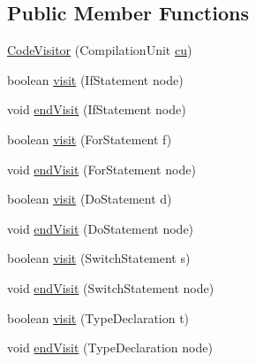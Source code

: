 \subsection*{Public Member Functions}
\begin{DoxyCompactItemize}
\item 
\hyperlink{classit_1_1isislab_1_1masonhelperdocumentation_1_1visitor_1_1_code_visitor_a187184161108b27007b877d0c2370443}{Code\-Visitor} (Compilation\-Unit \hyperlink{classit_1_1isislab_1_1masonhelperdocumentation_1_1visitor_1_1_code_visitor_af9088f73f92fd3640698ad4e660f042b}{cu})
\item 
boolean \hyperlink{classit_1_1isislab_1_1masonhelperdocumentation_1_1visitor_1_1_code_visitor_a8725175075e5b835707c806d7d168366}{visit} (If\-Statement node)
\item 
void \hyperlink{classit_1_1isislab_1_1masonhelperdocumentation_1_1visitor_1_1_code_visitor_ab5af98ceed9837f084b6d0a677b655ff}{end\-Visit} (If\-Statement node)
\item 
boolean \hyperlink{classit_1_1isislab_1_1masonhelperdocumentation_1_1visitor_1_1_code_visitor_ac93a6ee9bc2290dc054774d26a1e85f1}{visit} (For\-Statement f)
\item 
void \hyperlink{classit_1_1isislab_1_1masonhelperdocumentation_1_1visitor_1_1_code_visitor_ac0c818698da51575c8a9c9b6f643a96f}{end\-Visit} (For\-Statement node)
\item 
boolean \hyperlink{classit_1_1isislab_1_1masonhelperdocumentation_1_1visitor_1_1_code_visitor_afe7c0b57633a57e1cc2a5609163b48bd}{visit} (Do\-Statement d)
\item 
void \hyperlink{classit_1_1isislab_1_1masonhelperdocumentation_1_1visitor_1_1_code_visitor_aa83144733b831fd503c1cddb307abf68}{end\-Visit} (Do\-Statement node)
\item 
boolean \hyperlink{classit_1_1isislab_1_1masonhelperdocumentation_1_1visitor_1_1_code_visitor_a35fed6bc304be6fc1cf1b0d41e67cdea}{visit} (Switch\-Statement s)
\item 
void \hyperlink{classit_1_1isislab_1_1masonhelperdocumentation_1_1visitor_1_1_code_visitor_ac7190fc5f2c9e21dd1ffde65f3921d87}{end\-Visit} (Switch\-Statement node)
\item 
boolean \hyperlink{classit_1_1isislab_1_1masonhelperdocumentation_1_1visitor_1_1_code_visitor_a65b76f4e3876f0d044984dfe16c42d16}{visit} (Type\-Declaration t)
\item 
void \hyperlink{classit_1_1isislab_1_1masonhelperdocumentation_1_1visitor_1_1_code_visitor_ad08a404899ec7336cb57e02a6568ad09}{end\-Visit} (Type\-Declaration node)

\end{DoxyCompactItemize}
